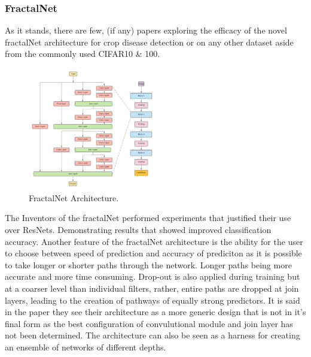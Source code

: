   \subsubsection{FractalNet}
    As it stands, there are few, (if any) papers exploring the efficacy of the novel fractalNet architecture \cite{Larsson2016} for crop disease detection or on any other dataset aside from the commonly used CIFAR10 \& 100.
    \par
      \begin{figure}
        \centering
        \includegraphics[width=0.5\textwidth]{Images/FractalNetArchitectureCopy}
        \caption{\label{fig:FractalNet_arcitecture}FractalNet Architecture.}
      \end{figure}
    \par
    The Inventors of the fractalNet performed experiments that justified their use over ResNets. Demonstrating results that showed improved classification accuracy. Another feature of the fractalNet architecture is the ability for the user to choose between speed of prediction and accuracy of prediciton as it is possible to take longer or shorter paths through the network. Longer paths being more accurate and more time consuming. Drop-out is also applied during training but at a coarser level than individual filters, rather, entire paths are dropped at join layers, leading to the creation of pathways of equally strong predictors.
    It is said in the paper they see their architecture as a more generic design that is not in it's final form as the best configuration of convulutional module and join layer has not been determined. The architecture can also be seen as a harness for creating an ensemble of networks of different depths.
